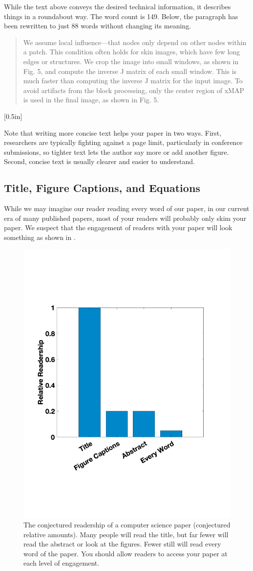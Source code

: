While the text above conveys the desired technical information, it describes things in a roundabout way.  The word count is 149. Below, the paragraph has been rewritten to just 88 words without changing its meaning.

\begin{quote}
We assume local influence---that nodes only depend on other nodes
within a patch.  This condition often holds for skin images, which
have few long edges or structures.  We crop the image into small
windows, as shown in Fig. 5, and compute the inverse J matrix of each
small window.  This is much faster than computing the inverse J matrix
for the input image.  To avoid artifacts from the block processing,
only the center region of xMAP is used in the final image, as shown in
Fig. 5.
\end{quote}
[0.5in]

Note that writing more concise text helps your paper in two ways.  First, researchers are typically fighting against a page limit, particularly in conference submissions, so tighter text lets the author say more or add another figure.  Second, concise text is usually clearer and easier to understand.






\subsection{Title, Figure Captions, and Equations}
While we may imagine our reader reading every word of our paper, in our current era of many published papers, most of your readers will probably only skim your paper. We suspect that the engagement of readers with your paper will look something as shown in \fig{\ref{fig:engagement}}.

\begin{figure}
\centerline{
\includegraphics[width=0.50\linewidth]{figures/papers/readership.pdf}}
\caption{The conjectured readership of a computer science paper (conjectured relative amounts).  Many people will read the title, but far fewer will read the abstract or look at the figures.  Fewer still will read every word of the paper.  You should allow readers to access your paper at each level of engagement.}
\label{fig:engagement}
\end{figure}

